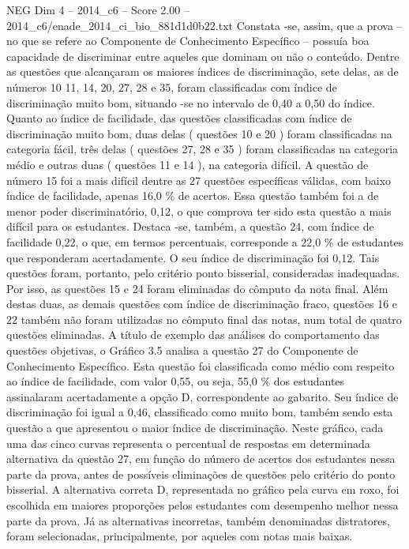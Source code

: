 \begin{textsample}{NEG Dim 4 – 2014\_c6 – Score 2.00 – 2014\_c6/enade\_2014\_ci\_bio\_881d1d0b22.txt}
Constata -se, assim, que a prova – no que se refere ao Componente de Conhecimento Específico – possuía boa capacidade de discriminar entre aqueles que dominam ou não o conteúdo.
Dentre as questões que alcançaram os maiores índices de discriminação, sete delas, as de números 10 11, 14, 20, 27, 28 e 35, foram classificadas com índice de discriminação muito bom, situando -se no intervalo de 0,40 a 0,50 do índice.
Quanto ao índice de facilidade, das questões classificadas com índice de discriminação muito bom, duas delas ( questões 10 e 20 ) foram classificadas na categoria fácil, três delas ( questões 27, 28 e 35 ) foram classificadas na categoria médio e outras duas ( questões 11 e 14 ), na categoria difícil.
A questão de número 15 foi a mais difícil dentre as 27 questões específicas válidas, com baixo índice de facilidade, apenas 16,0 \% de acertos.
Essa questão também foi a de menor poder discriminatório, 0,12, o que comprova ter sido esta questão a mais difícil para os estudantes.
Destaca -se, também, a questão 24, com índice de facilidade 0,22, o que, em termos percentuais, corresponde a 22,0 \% de estudantes que responderam acertadamente.
O seu índice de discriminação foi 0,12.
Tais questões foram, portanto, pelo critério ponto bisserial, consideradas inadequadas.
Por isso, as questões 15 e 24 foram eliminadas do cômputo da nota final.
Além destas duas, as demais questões com índice de discriminação fraco, questões 16 e 22 também não foram utilizadas no cômputo final das notas, num total de quatro questões eliminadas.
A título de exemplo das análises do comportamento das questões objetivas, o Gráfico 3.5 analisa a questão 27 do Componente de Conhecimento Específico.
Esta questão foi classificada como médio com respeito ao índice de facilidade, com valor 0,55, ou seja, 55,0 \% dos estudantes assinalaram acertadamente a opção D, correspondente ao gabarito.
Seu índice de discriminação foi igual a 0,46, classificado como muito bom, também sendo esta questão a que apresentou o maior índice de discriminação.
Neste gráfico, cada uma das cinco curvas representa o percentual de respostas em determinada alternativa da questão 27, em função do número de acertos dos estudantes nessa parte da prova, antes de possíveis eliminações de questões pelo critério do ponto bisserial.
A alternativa correta D, representada no gráfico pela curva em roxo, foi escolhida em maiores proporções pelos estudantes com desempenho melhor nessa parte da prova.
Já as alternativas incorretas, também denominadas distratores, foram selecionadas, principalmente, por aqueles com notas mais baixas.

\end{textsample}
